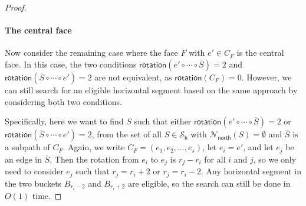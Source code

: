 \documentclass{article}\usepackage[a4paper,margin=20mm]{geometry}
\newcommand{\PH}{\mathcal{S}_\mathsf{h}}
\newcommand{\Nnorth}{\mathcal{N}_\mathsf{north}}
\newcommand{\rotation}{\mathsf{rotation}}
\begin{document}
\begin{proof}
 
 
 
   \paragraph{The central face} Now consider the remaining case where the face $F$ with $e' \in C_F$ is the central face. 
   In this case, the two conditions $\rotation(e' \circ \cdots \circ \overline{S}) = 2$ and  $\rotation(\overline{S} \circ \cdots \circ e') = 2$ are not equivalent, as $\rotation(C_F) = 0$. However, we can still search for an eligible horizontal segment based on the same approach by considering both two conditions. 
   
   Specifically, here   we want to find $S$ such that either  $\rotation(e' \circ \cdots \circ \overline{S}) = 2$ or $\rotation(\overline{S} \circ \cdots \circ e') = 2$, from the  set of all $S \in \PH$ with $\Nnorth(S) = \emptyset$ and $\overline{S}$ is a subpath of $C_F$. Again, we write $C_F=(e_1, e_2, \ldots, e_s)$, let $e_i  = e'$, and let $e_j$ be an edge in $\overline{S}$. Then the rotation  from $e_i$ to $e_j$ is $r_j - r_i$ for all $i$ and $j$, so  we only need to consider $e_j$ such that 
 $r_j = r_i + 2$ or $r_j  = r_i -2$. Any horizontal segment in the two buckets $B_{r_i-2}$ and $B_{r_i+2}$ are eligible, so the search can still be done in $O(1)$ time. 
 

\end{proof}
\end{document}
